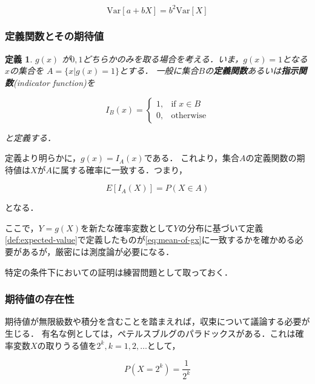 \documentclass[12pt,a4j,draft]{jarticle}
\numberwithin{equation}{section}
\theoremstyle{break}
\newtheorem{definition}{定義}[section]
\newcommand{\V}{\text{Var}}
\begin{document}
\begin{equation}
    \V [a + bX] = b^2 \V [X]
\end{equation}

\subsubsection{定義関数とその期待値}

\begin{definition}
\label{def:indicator-function}
$g(x)$ が$0,1$どちらかのみを取る場合を考える．いま，$g(x) = 1$となる$x$の集合を $A = \{ x | g(x) = 1 \}$とする．
一般に集合$B$の\textbf{定義関数}あるいは\textbf{指示関数}(indicator function)を

\begin{equation}
    I_B (x) = \begin{cases}
        1, & \text{if } x \in B \\
        0, & \text{otherwise}
    \end{cases}
\end{equation}

と定義する．
\end{definition}

定義より明らかに，$g(x) = I_A (x)$である．
これより，集合$A$の定義関数の期待値は$X$が$A$に属する確率に一致する．つまり，

\begin{equation}
    E[I_A (X)] = P(X \in A)
\end{equation}

となる．

ここで，$Y = g(X)$を新たな確率変数として$Y$の分布に基づいて定義\ref{def:expected-value}で定義したものが\eqref{eq:mean-of-gx}に一致するかを確かめる必要があるが，厳密には測度論が必要になる．

特定の条件下においての証明は練習問題として取っておく．

\subsubsection{期待値の存在性}

期待値が無限級数や積分を含むことを踏まえれば，収束について議論する必要が生じる．
有名な例としては，ペテルスブルグのパラドックスがある．これは確率変数$X$の取りうる値を$2^k, k=1,2,\ldots$として，

\begin{equation}
    P(X=2^k) = \frac{1}{2^k}
\end{equation}
\end{document}
